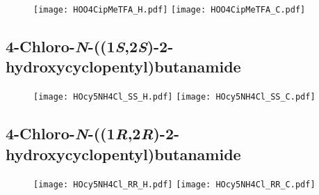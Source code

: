 \begin{figure}[H]
	\centering
		\texttt{[image: HOO4CipMeTFA\_H.pdf]}
		\texttt{[image: HOO4CipMeTFA\_C.pdf]}
\end{figure}

\subsection{4\hyp{}Chloro\hyp{}\textit{N}\hyp{}((1\textit{S},2\textit{S})\hyp{}2\hyp{}hydroxycyclopentyl)butanamide }

\begin{figure}[H]
	\centering
		\texttt{[image: HOcy5NH4Cl\_SS\_H.pdf]}
		\texttt{[image: HOcy5NH4Cl\_SS\_C.pdf]}
\end{figure}

\subsection{4\hyp{}Chloro\hyp{}\textit{N}\hyp{}((1\textit{R},2\textit{R})\hyp{}2\hyp{}hydroxycyclopentyl)butanamide }

\begin{figure}[H]
	\centering
		\texttt{[image: HOcy5NH4Cl\_RR\_H.pdf]}
		\texttt{[image: HOcy5NH4Cl\_RR\_C.pdf]}
\end{figure}







%


